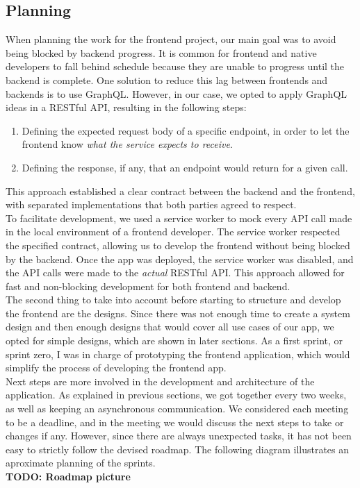 \documentclass[../memory.tex]{subfiles}
\begin{document}
\subsection{Planning}
When planning the work for the frontend project, our main goal was to avoid
being blocked by backend progress. It is common for frontend and native
developers to fall behind schedule because they are unable to progress until the
backend is complete. One solution to reduce this lag between frontends and
backends is to use GraphQL. However, in our case, we opted to apply GraphQL
ideas in a RESTful API, resulting in the following steps:
\begin{enumerate}[label = -]
	\item Defining the expected request body of a specific endpoint, in order to
	      let the frontend know \emph{what the service expects to receive}.
	\item Defining the response, if any, that an endpoint would return for a given call.
\end{enumerate}
This approach established a clear contract between the backend and the frontend,
with separated implementations that both parties agreed to respect.
\\
To facilitate development, we used a service worker to mock every API call made
in the local environment of a frontend developer. The service worker respected
the specified contract, allowing us to develop the frontend without being
blocked by the backend. Once the app was deployed, the service worker was
disabled, and the API calls were made to the \emph{actual} RESTful API. This
approach allowed for fast and non-blocking development for both frontend and
backend.
\\[8pt]
The second thing to take into account before starting to structure and develop
the frontend are the designs. Since there was not enough time to create a system
design and then enough designs that would cover all use cases of our app, we
opted for simple designs, which are shown in later sections. As a first sprint,
or sprint zero, I was in charge of prototyping the frontend application, which
would simplify the process of developing the frontend app.
\\[8pt]
Next steps are more involved in the development and architecture of the
application. As explained in previous sections, we got together every two weeks,
as well as keeping an asynchronous communication. We considered each meeting to
be a deadline, and in the meeting we would discuss the next steps to take or
changes if any. However, since there are always unexpected tasks, it has not
been easy to strictly follow the devised roadmap. The following diagram
illustrates an aproximate planning of the sprints.
\\
\textbf{TODO: Roadmap picture}
\end{document}
